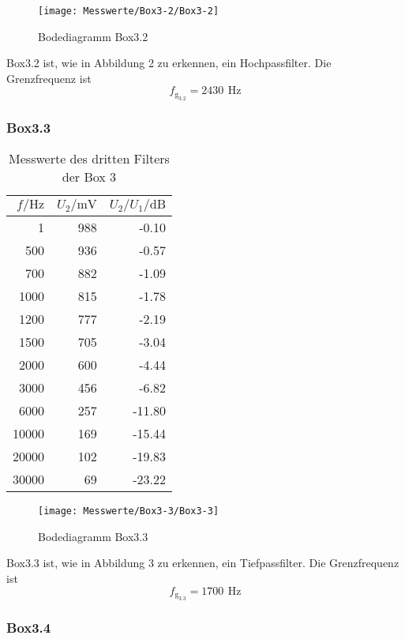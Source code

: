 \documentclass[a4paper, 12pt]{article}
\begin{document}
\begin{figure}[H]
	\texttt{[image: Messwerte/Box3-2/Box3-2]}
  \caption{Bodediagramm Box3.2}
\end{figure}
Box3.2 ist, wie in Abbildung 2 zu erkennen, ein Hochpassfilter.
Die Grenzfrequenz ist
$$f_{\textrm{g}_{3.2}} = 2430 \,\ \si{\hertz}$$

\subsubsection{Box3.3}

\begin{table}[H]
  \begin{center}
    \begin{tabular}{@{}rrr@{}}
      \toprule
      $f / \si{\hertz}$ & $U_2 / \si{\milli\volt}$ & $U_2/U_1 / \si{\deci\bel}$ \\ \midrule
      1     & 988 & -0.10\\
      500   & 936 & -0.57\\
      700   & 882 & -1.09\\
      1000  & 815 & -1.78\\
      1200  & 777 & -2.19\\
      1500  & 705 & -3.04\\
      2000  & 600 & -4.44\\
      3000  & 456 & -6.82\\
      6000  & 257 & -11.80\\
      10000 & 169 & -15.44\\
      20000 & 102 & -19.83\\
      30000 & 69  & -23.22\\ \bottomrule
    \end{tabular}
  \end{center}
  \caption{Messwerte des dritten Filters der Box 3}
\end{table}

\begin{figure}[H]
	\texttt{[image: Messwerte/Box3-3/Box3-3]}
  \caption{Bodediagramm Box3.3}
\end{figure}

Box3.3 ist, wie in Abbildung 3 zu erkennen, ein Tiefpassfilter.
Die Grenzfrequenz ist
$$f_{\textrm{g}_{3.3}} =  1700 \,\ \si{\hertz}$$

\subsubsection{Box3.4}
\end{document}
